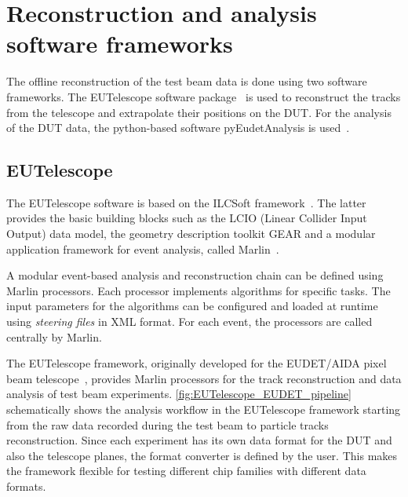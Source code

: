 \section{Reconstruction and analysis software frameworks}
\label{sec:recoSoft}

The offline reconstruction of the test beam data is done using two
software frameworks. The EUTelescope software
package~\cite{Rubinskiy,EutelescopeWebsite} is used to reconstruct the
tracks from the telescope and extrapolate their positions on the
DUT. For the analysis of the DUT data, the python-based software
pyEudetAnalysis is used~\cite{pyeudet}.

\subsection{EUTelescope}
\label{sec:EUTelescope}
The EUTelescope software is based on the ILCSoft
framework~\cite{Aplin:2009zz}. The latter provides the basic building
blocks such as the LCIO (Linear Collider Input Output) data model, the
geometry description toolkit GEAR and a modular application framework
for event analysis, called Marlin~\cite{Gaede:2006pj}.

A modular event-based analysis and reconstruction chain can be defined
using Marlin processors. Each processor implements algorithms for
specific tasks. The input parameters for the algorithms can be
configured and loaded at runtime using \textit{steering files} in XML
format. For each event, the processors are called centrally by Marlin.

The EUTelescope framework, originally developed for the EUDET/AIDA
pixel beam telescope~\cite{Rubinskiy:2014kza}, provides Marlin
processors for the track reconstruction and data analysis of test beam
experiments. \cref{fig:EUTelescope_EUDET_pipeline} schematically shows
the analysis workflow in the EUTelescope framework starting from the
raw data recorded during the test beam to particle tracks
reconstruction. Since each experiment has its own data format for the
DUT and also the telescope planes, the format converter is defined by
the user. This makes the framework flexible for testing different chip
families with different data formats.

